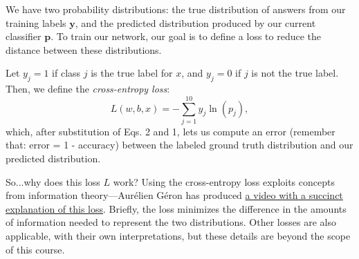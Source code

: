We have two probability distributions: the true distribution of answers from our training labels $\mathbf{y}$, and the predicted distribution produced by our current classifier $\mathbf{p}$. To train our network, our goal is to define a loss to reduce the distance between these distributions.

Let $y_j=1$ if class $j$ is the true label for $x$, and $y_j = 0$ if $j$ is not the true label. Then, we define the \emph{cross-entropy loss}:
\begin{equation}
    L(w,b,x) = - \sum_{j=1}^{10}y_j\ln(p_j),
\end{equation}
which, after substitution of Eqs. 2 and 1, lets us compute an error (remember that: error = 1 - accuracy) between the labeled ground truth distribution and our predicted distribution.

So...why does this loss $L$ work? Using the cross-entropy loss exploits concepts from information theory---Aur\'{e}lien G\'{e}ron has produced \href{https://www.youtube.com/watch?v=ErfnhcEV1O8}{a video with a succinct explanation of this loss}. Briefly, the loss minimizes the difference in the amounts of information needed to represent the two distributions. Other losses are also applicable, with their own interpretations, but these details are beyond the scope of this course.

%
%
%
%
%
%

